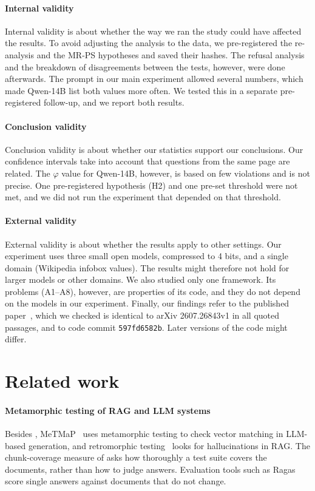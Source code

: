 \documentclass[preprint,12pt,authoryear]{elsarticle}
\newcommand{\mrps}{\textsc{MR-PS}}
\begin{document}
\paragraph{Internal validity}
Internal validity is about whether the way we ran the study could have affected the results. To
avoid adjusting the analysis to the data, we pre-registered the re-analysis and the \mrps{}
hypotheses and saved their hashes. The refusal analysis and the breakdown of disagreements between
the tests, however, were done afterwards. The prompt in our main experiment allowed several numbers,
which made Qwen-14B list both values more often. We tested this in a separate pre-registered
follow-up, and we report both results.

\paragraph{Conclusion validity}
Conclusion validity is about whether our statistics support our conclusions. Our confidence intervals
take into account that questions from the same page are related. The $\varphi$ value for Qwen-14B,
however, is based on few violations and is not precise. One pre-registered hypothesis (H2) and one
pre-set threshold were not met, and we did not run the experiment that depended on that threshold.

\paragraph{External validity}
External validity is about whether the results apply to other settings. Our experiment uses three
small open models, compressed to 4 bits, and a single domain (Wikipedia infobox values). The results
might therefore not hold for larger models or other domains. We also studied only one framework.
Its problems (A1--A8), however, are properties of its code, and they do not depend on the models in
our experiment. Finally, our findings refer to the published paper~\citep{kim2026knowledge}, which we
checked is identical to arXiv 2607.26843v1 in all quoted passages, and to code commit
\texttt{597fd6582b}. Later versions of the code might differ.

\section{Related work}
\label{sec:related}

\paragraph{Metamorphic testing of RAG and LLM systems}
Besides \citet{kim2026knowledge}, MeTMaP~\citep{wang2024metmap} uses metamorphic testing to check
vector matching in LLM-based generation, and retromorphic testing~\citep{yu2026retromorphic} looks for
hallucinations in RAG. The chunk-coverage measure of \citet{kim2026chunk} asks how thoroughly a test
suite covers the documents, rather than how to judge answers. Evaluation tools such as
Ragas~\citep{es2023ragas} score single answers against documents that do not change.
\end{document}
